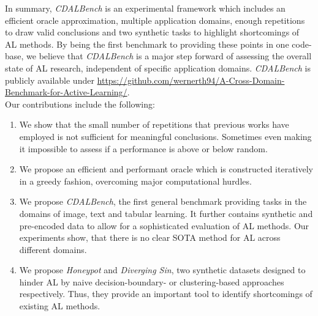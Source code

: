 \documentclass[]{article}
\begin{document}
In summary, \emph{CDALBench} is an experimental framework which includes an
efficient oracle approximation, multiple application domains, enough repetitions to
draw valid conclusions and two synthetic tasks to highlight shortcomings of AL methods. 
By being the first benchmark to providing these points in one code-base, 
we believe that \emph{CDALBench} is a major step forward of assessing the overall state of AL research, independent of
specific application domains. \emph{CDALBench} is publicly available under \url{https://github.com/wernerth94/A-Cross-Domain-Benchmark-for-Active-Learning/}. 
\\ [1mm]
Our contributions include the following:
%
\begin{enumerate}
\item\label{cont:repetitions} We show that the small number of repetitions that previous works have employed is not
sufficient for meaningful conclusions. Sometimes even making it impossible to assess if a performance is above or below random.
\item\label{cont:oracle} We propose an efficient and performant oracle which is constructed iteratively in a greedy fashion,
overcoming major computational hurdles.
\item\label{cont:domains} We propose \emph{CDALBench}, the first general benchmark providing tasks
in the domains of image, text and tabular learning. It further contains
synthetic and pre-encoded data to allow for a sophisticated evaluation of AL
methods. Our experiments show, that there is no clear SOTA method
for AL across different domains.
\item\label{cont:synthdata} We propose \emph{Honeypot} and \emph{Diverging Sin}, two synthetic datasets
designed to hinder AL by naive decision-boundary- or
clustering-based approaches respectively. Thus, they provide an important tool to identify 
shortcomings of existing AL methods.
\end{enumerate}


\end{document}

